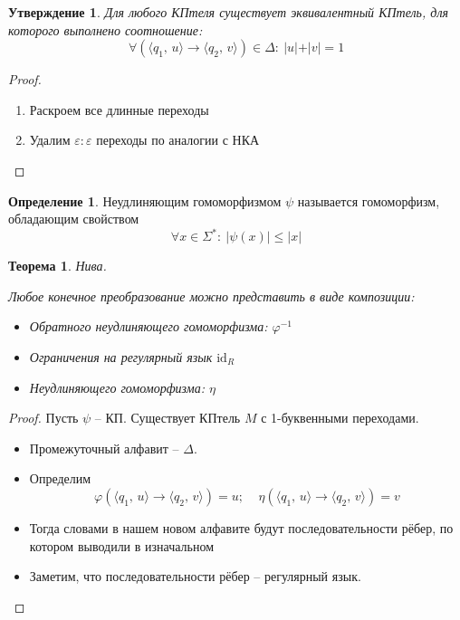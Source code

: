 \documentclass[a4paper,12pt]{article}
\renewcommand{\phi}{\ensuremath{\varphi}}
\renewcommand{\leq}{\ensuremath{\leqslant}}
\theoremstyle{plain}
\newtheorem{theorem}{Теорема}[subsection]
\newtheorem{proposition}{Утверждение}[subsection]
\theoremstyle{definition}
\newtheorem{definition}{Определение}[subsection]
\theoremstyle{remark}
\begin{document}
\begin{proposition}
	Для любого КПтеля существует эквивалентный КПтель, для которого выполнено соотношение:
	\[
		\forall(\langle q_1,\,u\rangle\to\langle q_2,\, v\rangle) \in \Delta :\: \vert u\vert + \vert v\vert = 1
	\]
\end{proposition}

\begin{proof}
	\begin{enumerate}
		\item Раскроем все длинные переходы
		\item Удалим $\varepsilon:\varepsilon$ переходы по аналогии с НКА
	\end{enumerate}
\end{proof}

\begin{definition}
	Неудлиняющим гомоморфизмом $\psi$ называется  гомоморфизм, обладающим свойством
	\[
		\forall x \in \Sigma^* :\: \vert \psi(x)\vert \leq \vert x\vert
	\]
\end{definition}

\begin{theorem}
	Нива.

	Любое конечное преобразование можно представить в виде композиции:
	\begin{itemize}
		\item Обратного неудлиняющего гомоморфизма: $\phi^{-1}$
		\item Ограничения на регулярный язык $\text{id}_R$
		\item Неудлиняющего гомоморфизма: $\eta$
	\end{itemize}
\end{theorem}

\begin{proof}
	Пусть $\psi$ -- КП. Существует КПтель $M$ с 1-буквенными переходами.

	\begin{itemize}
		\item Промежуточный алфавит -- $\Delta$.
		\item Определим
		      \[
			      \phi(\langle q_1,\,u\rangle \to \langle q_2,\, v\rangle) = u;\;\;\;\;\eta(\langle q_1,\,u\rangle \to \langle q_2,\, v\rangle) = v
		      \]
		\item Тогда словами в нашем новом алфавите будут последовательности рёбер, по котором выводили в изначальном
		\item Заметим, что последовательности рёбер -- регулярный язык.
	\end{itemize}
\end{proof}
\end{document}
